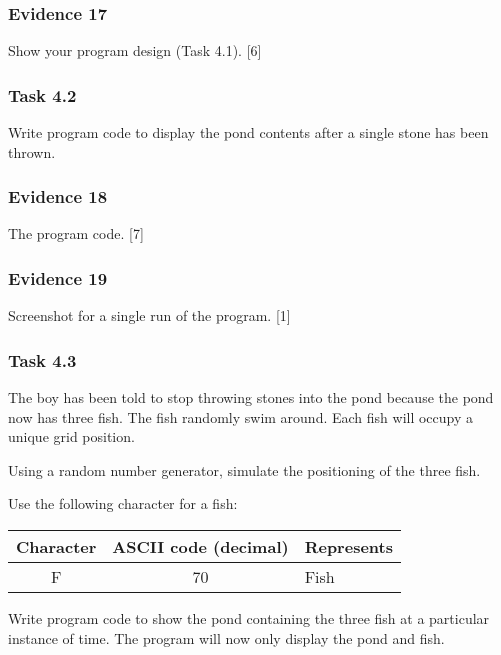 \subsubsection*{Evidence 17}

Show your program design (Task 4.1). \hfill{} {[}6{]}

\subsubsection*{Task 4.2}

Write program code to display the pond contents after a single stone
has been thrown. 

\subsubsection*{Evidence 18}

The program code. \hfill{} {[}7{]}

\subsubsection*{Evidence 19}

Screenshot for a single run of the program. \hfill{} {[}1{]}

\subsubsection*{Task 4.3}

The boy has been told to stop throwing stones into the pond because
the pond now has three fish. The fish randomly swim around. Each fish
will occupy a unique grid position.

Using a random number generator, simulate the positioning of the three
fish. 

Use the following character for a fish: 
\begin{center}
\begin{tabular}{|c|c|l|}
\hline 
Character & ASCII code (decimal) & \texttt{\hspace{0.01\columnwidth}}Represents\tabularnewline
\hline 
F & 70 & Fish\tabularnewline
\hline 
\end{tabular}
\par\end{center}

Write program code to show the pond containing the three fish at a
particular instance of time. The program will now only display the
pond and fish. 

